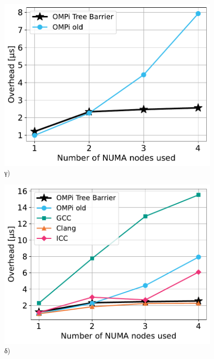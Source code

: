 \begin{figure}[htbp]
\begin{minipage}{0.5\textwidth}
        \centering
        \includegraphics[width=1\textwidth]{Figures/parade-epcc/ompionly_topothreads_tpn-16_spread.pdf}
        γ)
    \end{minipage}\hfill
    \begin{minipage}{0.5\textwidth}
        \centering
        \includegraphics[width=1\textwidth]{Figures/parade-epcc/topothreads_tpn-16_spread.pdf}
        δ)
    \end{minipage}
    \newline
    \begin{minipage}{0.5\textwidth}
        \centering

\end{minipage}
\end{figure}

